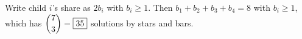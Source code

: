 Write child $i$'s share as $2b_i$ with $b_i\ge1$. Then $b_1+b_2+b_3+b_4=8$ with $b_i\ge1$, which has $\dbinom{7}{3}=\boxed{35}$ solutions by stars and bars.
